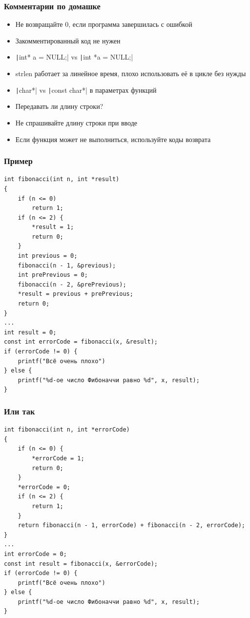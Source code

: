 \documentclass{../../slides-style}
\begin{document}
    
    \begin{frame}[plain]
        \titlepage
    \end{frame}

    \begin{frame}
        \frametitle{Комментарии по домашке}
        \begin{itemize}
            \item Не возвращайте 0, если программа завершилась с ошибкой
            \item Закомментированный код не нужен
            \item \texttt|int* a = NULL;| vs \texttt|int *a = NULL;|
            \item strlen работает за линейное время, плохо использовать её в цикле без нужды
            \item \texttt|char*| vs \texttt|const char*| в параметрах функций
            \item Передавать ли длину строки?
            \item Не спрашивайте длину строки при вводе
            \item Если функция может не выполниться, используйте коды возврата
        \end{itemize}
    \end{frame}

    \begin{frame}[fragile]
        \frametitle{Пример}
        \begin{scriptsize}
            \begin{verbatim}
int fibonacci(int n, int *result)
{
    if (n <= 0)
        return 1; 
    if (n <= 2) { 
        *result = 1; 
        return 0;
    }
    int previous = 0;
    fibonacci(n - 1, &previous);
    int prePrevious = 0;
    fibonacci(n - 2, &prePrevious);
    *result = previous + prePrevious;
    return 0;
}
...
int result = 0;
const int errorCode = fibonacci(x, &result);
if (errorCode != 0) {
    printf("Всё очень плохо")
} else {
    printf("%d-ое число Фибоначчи равно %d", x, result);
}
            \end{verbatim}
        \end{scriptsize}
    \end{frame}

    \begin{frame}[fragile]
        \frametitle{Или так}
        \begin{scriptsize}
            \begin{verbatim}
int fibonacci(int n, int *errorCode)
{
    if (n <= 0) {
        *errorCode = 1;
        return 0;
    } 
    *errorCode = 0;
    if (n <= 2) { 
        return 1;
    }
    return fibonacci(n - 1, errorCode) + fibonacci(n - 2, errorCode);
}
...
int errorCode = 0;
const int result = fibonacci(x, &errorCode);
if (errorCode != 0) {
    printf("Всё очень плохо")
} else {
    printf("%d-ое число Фибоначчи равно %d", x, result);
}
            \end{verbatim}
        \end{scriptsize}
    \end{frame}
\end{document}
